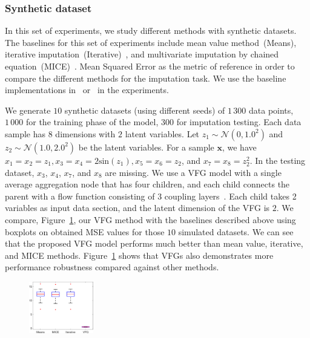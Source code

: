 \documentclass[sigconf, anonymous, review]{acmart}
\theoremstyle{plain}
\theoremstyle{definition}
\theoremstyle{remark}
\begin{document}
\subsubsection{Synthetic dataset} In this set of experiments, we study different methods  with synthetic datasets. The baselines for this set of experiments include mean value method~(Means), iterative imputation~(Iterative)~\cite{buck1960method}, and multivariate imputation by chained equation~(MICE)~\cite{van2011mice}.  Mean Squared Error as the metric of reference in order to compare the different methods for the imputation task. We use the baseline implementations in~\cite{scikit-learn} or~\cite{Impyute} in the experiments.


We generate $10$ synthetic datasets (using different seeds) of $1\,300$ data points, $1\,000$ for the training phase of the model, $300$ for imputation testing. 
Each data sample  has $8$ dimensions with $2$ latent variables. 
Let $z_1 \sim \mathcal{N}(0,1.0^2)$ and $z_2 \sim  \mathcal{N}(1.0,2.0^2)$ be the latent variables. For a sample $\mathbf{x}$, we have  $x_1=x_2 = z_1, x_3=x_4= 2\textrm{sin}(z_1), x_5=x_6 =z_2$, and $x_7= x_8 = z_2^2$.  In the testing dataset, $x_3$, $x_4$, $x_7$, and $x_8$ are missing. We use a VFG model with a single average aggregation node that has four children, and each child connects the parent with a flow function consisting of 3 coupling layers~\cite{Dinh2016DensityEU}. Each child takes 2 variables as input data section, and the latent dimension of the VFG is $2$.
We compare, Figure~\ref{fig:sim}, our VFG method with the baselines described above using boxplots on obtained MSE values for those $10$ simulated datasets.
We can see that the proposed VFG model performs much better than mean value, iterative, and MICE methods. Figure~\ref{fig:sim} shows that VFGs also demonstrates more performance robustness compared against other methods. 
\begin{figure}[h]
  \centering
      \includegraphics[width=0.25\textwidth]{image/sim_box.eps}
    \label{fig:sim}
\end{figure}
\end{document}
